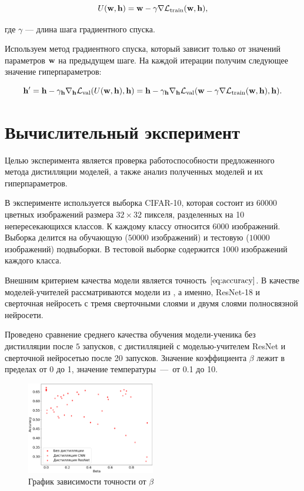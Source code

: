 \documentclass[12pt, twoside]{article}
\begin{document}
\begin{equation} \label{eq:operator}
    U(\bw, \bh) = \bw - \gamma\nabla\cL_\text{train}(\bw, \bh),
\end{equation}

\noindent
где $\gamma$ — длина шага градиентного спуска.

Используем метод градиентного спуска, который зависит только от значений параметров $\mathbf{w}$ на предыдущем шаге. На каждой итерации получим следующее значение гиперпараметров:

\begin{equation} \label{eq:hyp_alg}
    \bh^\prime = \bh - \gamma_{\bh}\nabla_{\bh}\cL_\text{val}(U(\bw, \bh), \bh) = \bh - \gamma_{\bh}\nabla_{\bh}\cL_\text{val}(\bw - \gamma\nabla\cL_\text{train}(\bw, \bh), \bh).
\end{equation}



\section{Вычислительный эксперимент}

Целью эксперимента является проверка работоспособности предложенного метода дистилляции моделей, а также анализ полученных моделей и их гиперпараметров.

В эксперименте используется выборка CIFAR-10, которая состоит из $60000$ цветных изображений размера $32 \times 32$ пикселя, разделенных на 10 непересекающихся классов. К каждому классу относится $6000$ изображений. Выборка делится на обучающую ($50000$ изображений) и тестовую ($10000$ изображений) подвыборки. В тестовой выборке содержится $1000$ изображений каждого класса.

Внешним критерием качества модели является точность $\eqref{eq:accuracy}$. В качестве моделей-учителей рассматриваются модели из \cite{conf/cvpr/PassalisTT20}, а именно, ResNet-18 и сверточная нейросеть с тремя сверточными слоями и двумя слоями полносвязной нейросети.

Проведено сравнение среднего качества обучения модели-ученика без дистилляции после $5$ запусков, с дистилляцией с моделью-учителем ResNet и сверточной нейросетью после 20 запусков. Значение коэффициента $\beta$ лежит в пределах от 0 до 1, значение температуры~---~от 0.1 до 10.

\begin{figure}[!ht]
    \centering
    \includegraphics[width=0.5\textwidth]{scatter_beta_acc.eps}
    \caption{График зависимости точности от $\beta$}
    \label{fig:beta_acc}
\end{figure}
\end{document}

